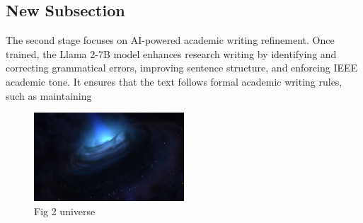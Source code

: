 \documentclass[conference]{IEEEtran}
\begin{document}
  
    
      \subsection{New Subsection}
      The second stage focuses on AI-powered academic writing refinement. Once trained, the Llama 2-7B model enhances research writing by identifying and correcting grammatical errors, improving sentence structure, and enforcing IEEE academic tone. It ensures that the text follows formal academic writing rules, such as maintaining 

\begin{figure}[h]
\centering
\includegraphics[width=0.5\textwidth]{..//uploads/1740076397928.jpg}
\caption{Fig 2 universe}
\end{figure}


    
  
\end{document}
